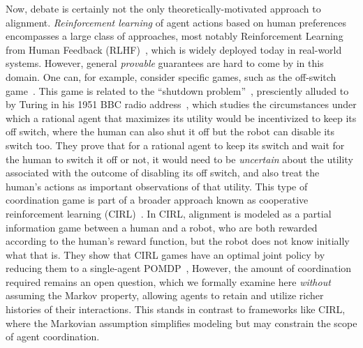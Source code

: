 Now, debate is certainly not the only theoretically-motivated approach to alignment.
\emph{Reinforcement learning} of agent actions based on human preferences encompasses a large class of approaches, most notably Reinforcement Learning from Human Feedback (RLHF)~\citep{christiano2017deep,ziegler2019fine,bai2022training}, which is widely deployed today in real-world systems.
However, general \emph{provable} guarantees are hard to come by in this domain.
One can, for example, consider specific games, such as the off-switch game~\citep{hadfield2017off}.
This game is related to the ``shutdown problem''~\citep{soares2015corrigibility}, presciently alluded to by Turing in his 1951 BBC radio address~\citep[pg. 6a]{turing1951}, which studies the circumstances under which a rational agent that maximizes its utility would be incentivized to keep its off switch, where the human can also shut it off but the robot can disable its switch too.
They prove that for a rational agent to keep its switch and wait for the human to switch it off or not, it would need to be \emph{uncertain} about the utility associated with the outcome of disabling its off switch, and also treat the human's actions as important observations of that utility.
This type of coordination game is part of a broader approach known as cooperative reinforcement learning (CIRL)~\citep{hadfield2016cooperative}.
In CIRL, alignment is modeled as a partial information game between a human and a robot, who are both rewarded according to the human's reward function, but the robot does not know initially what that is.
They show that CIRL games have an optimal joint policy by reducing them to a single-agent POMDP~\citep{sondik1971optimal,kaelbling1998planning}, 
However, the amount of coordination required remains an open question, which we formally examine here \emph{without} assuming the Markov property, allowing agents to retain and utilize richer histories of their interactions. 
This stands in contrast to frameworks like CIRL, where the Markovian assumption simplifies modeling but may constrain the scope of agent coordination.

